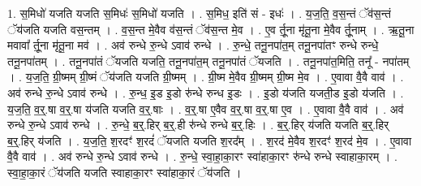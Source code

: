 \documentclass[17pt]{extarticle}
\begin{document}
1. स॒मिधो॑ यजति यजति स॒मिधः॑ स॒मिधो॑ यजति । . स॒मिध॒ इति॑ सं - इधः॑ । . य॒ज॒ति॒ व॒स॒न्तं ॅव॑स॒न्तं ॅय॑जति यजति वस॒न्तम् । . व॒स॒न्त मे॒वैव व॑स॒न्तं ॅव॑स॒न्त मे॒व । . ए॒व र्तू॒ना मृ॑तू॒ना मे॒वैव र्तू॒नाम् । . ऋ॒तू॒ना मवावा᳚ र्तू॒ना मृ॑तू॒ना मव॑ । . अव॑ रुन्धे रु॒न्धे ऽवाव॑ रुन्धे । . रु॒न्धे॒ तनू॒नपा॑त॒म् तनू॒नपा॑तꣳ रुन्धे रुन्धे॒ तनू॒नपा॑तम् । . तनू॒नपा॑तं ॅयजति यजति॒ तनू॒नपा॑त॒म् तनू॒नपा॑तं ॅयजति । . तनू॒नपा॑त॒मिति॒ तनू᳚ - नपा॑तम् । . य॒ज॒ति॒ ग्री॒ष्मम् ग्री॒ष्मं ॅय॑जति यजति ग्री॒ष्मम् । . ग्री॒ष्म मे॒वैव ग्री॒ष्मम् ग्री॒ष्म मे॒व । . ए॒वावा वै॒वै वाव॑ । . अव॑ रुन्धे रु॒न्धे ऽवाव॑ रुन्धे । . रु॒न्ध॒ इ॒ड इ॒डो रु॑न्धे रुन्ध इ॒डः । . इ॒डो य॑जति यजती॒ड इ॒डो य॑जति । . य॒ज॒ति॒ व॒र्॒.षा व॒र्॒.षा य॑जति यजति व॒र्॒.षाः । . व॒र्॒.षा ए॒वैव व॒र्॒.षा व॒र्॒.षा ए॒व । . ए॒वावा वै॒वै वाव॑ । . अव॑ रुन्धे रु॒न्धे ऽवाव॑ रुन्धे । . रु॒न्धे॒ ब॒र्॒.हिर् ब॒र्॒.ही रु॑न्धे रुन्धे ब॒र्॒.हिः । . ब॒र्॒.हिर् य॑जति यजति ब॒र्॒.हिर् ब॒र्॒.हिर् य॑जति । . य॒ज॒ति॒ श॒रदꣳ॑ श॒रदं॑ ॅयजति यजति श॒रद᳚म् । . श॒रद॑ मे॒वैव श॒रदꣳ॑ श॒रद॑ मे॒व । . ए॒वावा वै॒वै वाव॑ । . अव॑ रुन्धे रु॒न्धे ऽवाव॑ रुन्धे । . रु॒न्धे॒ स्वा॒हा॒का॒रꣳ स्वा॑हाका॒रꣳ रु॑न्धे रुन्धे स्वाहाका॒रम् । . स्वा॒हा॒का॒रं ॅय॑जति यजति स्वाहाका॒रꣳ स्वा॑हाका॒रं ॅय॑जति । \newline
\end{document}

